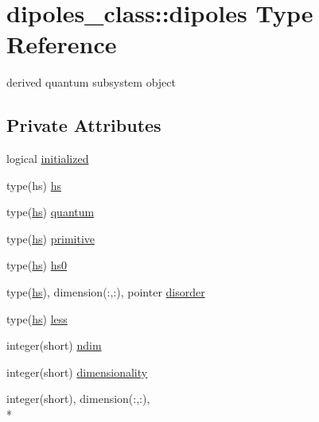 \hypertarget{structdipoles__class_1_1dipoles}{\section{dipoles\-\_\-class\-:\-:dipoles Type Reference}
\label{structdipoles__class_1_1dipoles}
}


derived quantum subsystem object  


\subsection*{Private Attributes}
\begin{DoxyCompactItemize}
\item 
logical \hyperlink{structdipoles__class_1_1dipoles_a62234fd4a1f98f377becc909912c8785}{initialized}
\item 
type(hs) \hyperlink{structdipoles__class_1_1dipoles_afa2264f1ca48581328e2ab0e1745db4a}{hs}
\item 
type(\hyperlink{structdipoles__class_1_1dipoles_afa2264f1ca48581328e2ab0e1745db4a}{hs}) \hyperlink{structdipoles__class_1_1dipoles_a7b6d2a8feca2c1198896fb10627d029b}{quantum}
\item 
type(\hyperlink{structdipoles__class_1_1dipoles_afa2264f1ca48581328e2ab0e1745db4a}{hs}) \hyperlink{structdipoles__class_1_1dipoles_a56b509ba86b8121570bd7a051cc77fd9}{primitive}
\item 
type(\hyperlink{structdipoles__class_1_1dipoles_afa2264f1ca48581328e2ab0e1745db4a}{hs}) \hyperlink{structdipoles__class_1_1dipoles_a2c208f78e585ed71764e1b37c20be201}{hs0}
\item 
type(\hyperlink{structdipoles__class_1_1dipoles_afa2264f1ca48581328e2ab0e1745db4a}{hs}), dimension(\-:,\-:), pointer \hyperlink{structdipoles__class_1_1dipoles_a8baa5323891d02dede517c209f432c27}{disorder}
\item 
type(\hyperlink{structdipoles__class_1_1dipoles_afa2264f1ca48581328e2ab0e1745db4a}{hs}) \hyperlink{structdipoles__class_1_1dipoles_a0d7a80c3e1a97942236e3e7a1a373cca}{less}
\item 
integer(short) \hyperlink{structdipoles__class_1_1dipoles_a1b540b65199b326d6d477307d646fb1b}{ndim}
\item 
integer(short) \hyperlink{structdipoles__class_1_1dipoles_ae809ff43be02c6f93cd5a6010368a246}{dimensionality}
\item 
integer(short), dimension(\-:,\-:), \\*

\end{DoxyCompactItemize}
